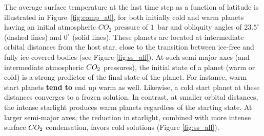 \documentclass[fleqn,usenatbib]{mnras}
\providecommand{\DIFadd}[1]{{\bf #1}} %
\providecommand{\DIFdel}[1]{} %
\providecommand{\DIFaddbegin}{} %
\providecommand{\DIFaddend}{} %
\providecommand{\DIFdelbegin}{} %
\providecommand{\DIFdelend}{} %
\newcommand{\DIFscaledelfig}{0.5}
\newlength{\DIFdelgraphicswidth} %
\newlength{\DIFdelgraphicsheight} %
\newcommand{\DIFaddincludegraphics}[2][]{{\color{blue}\fbox{\DIFOincludegraphics[#1]{#2}}}} %
\newcommand{\DIFdelincludegraphics}[2][]{%
\sbox{\DIFdelgraphicsbox}{\DIFOincludegraphics[#1]{#2}}%
\settoboxwidth{\DIFdelgraphicswidth}{\DIFdelgraphicsbox} %
\settoboxtotalheight{\DIFdelgraphicsheight}{\DIFdelgraphicsbox} %
\scalebox{\DIFscaledelfig}{%
\parbox[b]{\DIFdelgraphicswidth}{\usebox{\DIFdelgraphicsbox}\\[-\baselineskip] \rule{\DIFdelgraphicswidth}{0em}}\llap{\resizebox{\DIFdelgraphicswidth}{\DIFdelgraphicsheight}{%
\setlength{\unitlength}{\DIFdelgraphicswidth}%
\begin{picture}(1,1)%
\thicklines\linethickness{2pt} %
{\color[rgb]{1,0,0}\put(0,0){\framebox(1,1){}}}%
{\color[rgb]{1,0,0}\put(0,0){\line( 1,1){1}}}%
{\color[rgb]{1,0,0}\put(0,1){\line(1,-1){1}}}%
\end{picture}%
}\hspace*{3pt}}} %
} %
\DeclareRobustCommand{\DIFaddbegin}{\DIFOaddbegin \let\includegraphics\DIFaddincludegraphics} %
\DeclareRobustCommand{\DIFaddend}{\DIFOaddend \let\includegraphics\DIFOincludegraphics} %
\DeclareRobustCommand{\DIFdelbegin}{\DIFOdelbegin \let\includegraphics\DIFdelincludegraphics} %
\DeclareRobustCommand{\DIFdelend}{\DIFOaddend \let\includegraphics\DIFOincludegraphics} %
\begin{document}
The  average surface temperature at the last time step as a function of latitude is illustrated in Figure~\ref{fig:comp_a0}, for both initially cold and warm planets having an initial atmospheric $CO_{\mathrm{2}}$ pressure of $1$~bar and obliquity angles of $23.5^{\circ}$ (dashed lines) and $0^{\circ}$ (solid lines). These planets are located at intermediate orbital distances from the host star, close to the transition between ice-free and fully ice-covered bodies (see Figure \ref{fig:ss_all}). At such semi-major axes (and intermediate atmospheric $CO_{\rm 2}$ pressures), the initial state of a planet (warm or cold) is a strong predictor of  the final state of the planet. For instance, \DIFdelbegin \DIFdel{such }\DIFdelend warm start planets \DIFaddbegin \DIFadd{tend to }\DIFaddend end up warm as well. Likewise, a cold start planet at these distances converges to a frozen solution\DIFdelbegin \DIFdel{also}\DIFdelend . In contrast, at smaller  orbital distances, the intense starlight produces warm planets regardless of the starting state. At larger semi-major axes, the reduction in starlight, combined with more intense surface $CO_{\rm 2}$ condensation, favors cold solutions (Figure \ref{fig:ss_all}). 
\end{document}
